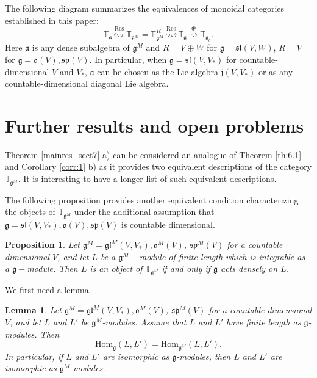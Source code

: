 \documentclass[10pt]{amsart}
\newcounter{theorem}
\newtheorem{lemma}[theo]{Lemma}
\newtheorem{prop}[theo]{Proposition}
\newcommand{\TT}{\mathbb{T}}
\newcommand{\jj}{\mathfrak{j}}
\renewcommand{\sp}{\mathfrak{sp}}
\renewcommand{\sl}{\mathfrak{sl}}
\newcommand{\oo}{\mathfrak{o}}
\renewcommand{\aa}{\mathfrak{a}}
\renewcommand{\gg}{\mathfrak{g}}
\newcommand{\gl}{\mathfrak{gl}}
\newcommand{\Hom}{\mathrm{Hom}}
\begin{document}
\vspace{0.33cm}

The following diagram summarizes the equivalences of monoidal categories established in this paper:
$$ \TT_{\aa} \stackrel{\operatorname{Res}}{\leftsquigarrow} \TT_{\gg^M} = \TT_{\gg^M}^R \stackrel {\operatorname{Res}}{\rightsquigarrow} \TT_{\gg} \stackrel{\Phi}{\rightsquigarrow} \TT_{\gg_c}.$$
Here $\aa$ is any dense subalgebra of $\gg^M$ and $R = V\oplus W$ for $\gg = \sl(V,W)$, $R=V$ for $\gg = \oo(V), \sp(V)$. In particular, when $\gg = \sl(V,V_*)$ for countable-dimensional $V$ and $V_*$, $\aa$ can be chosen as the Lie algebra $\jj(V,V_*)$ or as any countable-dimensional diagonal Lie algebra.

\section{Further results and open problems}\label{sect:8}

Theorem \ref{mainres_sect7} a) can be considered an analogue of Theorem \ref{th:6.1} and Corollary \ref{corr:1} b) as it provides two equivalent descriptions of the category $\TT_{\gg^M}$. It is interesting to have a longer list of such equivalent descriptions.

The following proposition provides another equivalent condition characterizing the objects of $\TT_{\gg^M}$ under the additional assumption that 
$\gg= \sl(V,V_*), \oo(V), \sp(V)$ is countable dimensional.


\begin{prop}\label{prop_sect8}
Let $\gg^M=\gl^M(V,V_*), \oo^M(V)$, $\sp^M(V)$ for a countable dimensional $V$, and let $L$ be a $\gg^M-$module of finite length which is integrable as a $\gg-$module. Then $L$ is an object of $\TT_{\gg^M}$ if and only if $\gg$ acts densely on $L$.
\end{prop}

We first need a lemma.

\begin{lemma}\label{extension} Let $\gg^M=\gl^M(V,V_*), \oo^M(V)$, $\sp^M(V)$ for a countable dimensional $V$, and let $L$ and $L'$ be  
$\gg^M$-modules. 
Assume that $L$ and $L'$ have finite length as $\gg$-modules. Then 
$$\Hom_{\gg}(L,L')=\Hom_{\gg^M}(L,L').$$
In particular, if $L$ and $L'$ are isomorphic as $\gg$-modules, then $L$ and $L'$ are isomorphic as $\gg^M$-modules. 
\end{lemma}
\end{document}
